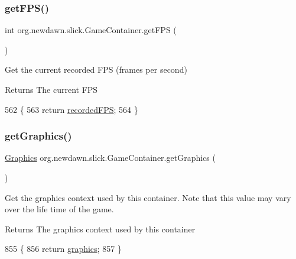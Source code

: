 \subsubsection{\texorpdfstring{get\+F\+P\+S()}{getFPS()}}
{\footnotesize\ttfamily int org.\+newdawn.\+slick.\+Game\+Container.\+get\+F\+PS (\begin{DoxyParamCaption}{ }\end{DoxyParamCaption})\hspace{0.3cm}{\ttfamily [inline]}}

Get the current recorded F\+PS (frames per second)

\begin{DoxyReturn}{Returns}
The current F\+PS 
\end{DoxyReturn}

\begin{DoxyCode}
562                         \{
563         \textcolor{keywordflow}{return} \mbox{\hyperlink{classorg_1_1newdawn_1_1slick_1_1_game_container_a1b65e4d07aaae2b711971a95e55667be}{recordedFPS}};
564     \}
\end{DoxyCode}
\mbox{\label{classorg_1_1newdawn_1_1slick_1_1_game_container_a007825fb0bdfca1bc0e102687387fb59}} 
\subsubsection{\texorpdfstring{get\+Graphics()}{getGraphics()}}
{\footnotesize\ttfamily \mbox{\hyperlink{classorg_1_1newdawn_1_1slick_1_1_graphics}{Graphics}} org.\+newdawn.\+slick.\+Game\+Container.\+get\+Graphics (\begin{DoxyParamCaption}{ }\end{DoxyParamCaption})\hspace{0.3cm}{\ttfamily [inline]}}

Get the graphics context used by this container. Note that this value may vary over the life time of the game.

\begin{DoxyReturn}{Returns}
The graphics context used by this container 
\end{DoxyReturn}

\begin{DoxyCode}
855                                   \{
856         \textcolor{keywordflow}{return} \mbox{\hyperlink{classorg_1_1newdawn_1_1slick_1_1_game_container_ab33d45e90ae9dcfcfd9c7a907415a58b}{graphics}};
857     \}
\end{DoxyCode}
\mbox{\label{classorg_1_1newdawn_1_1slick_1_1_game_container_a7eff88473fe5715fdfc2f92e8cb48521}} 
